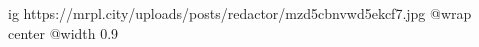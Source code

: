  
 
 
 
 

\ifcmt
  ig https://mrpl.city/uploads/posts/redactor/mzd5cbnvwd5ekcf7.jpg
  @wrap center
  @width 0.9
\fi

